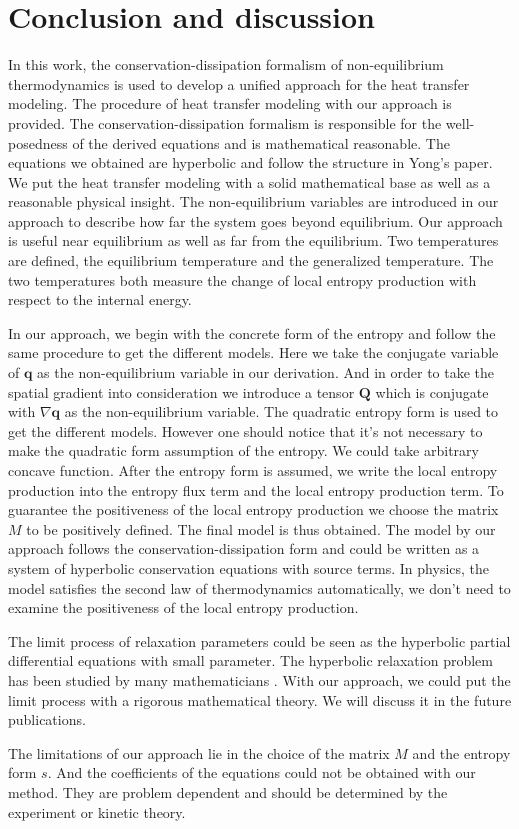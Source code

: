 \documentclass[a4paper]{article}
\begin{document}
\section{Conclusion and discussion}
In this work, the conservation-dissipation formalism of non-equilibrium thermodynamics is used to develop a unified approach for the heat transfer modeling. The procedure of heat transfer modeling with our approach is provided. The conservation-dissipation formalism is responsible for the well-posedness of the derived equations and is mathematical reasonable. The equations we obtained are hyperbolic and follow the structure in Yong's paper.\cite{yong2008interesting} We put the heat transfer modeling with a solid mathematical base as well as a reasonable physical insight. The non-equilibrium variables are introduced in our approach to describe how far the system goes beyond equilibrium. Our approach is useful near equilibrium as well as far from the equilibrium. Two temperatures are defined, the equilibrium temperature and the generalized temperature. The two temperatures both measure the change of local entropy production with respect to the internal energy. 

In our approach, we begin with the concrete form of the entropy and follow the same procedure to get the different models. Here we take the conjugate variable of $\mathbf{q}$ as the non-equilibrium variable in our derivation. And in order to take the spatial gradient into consideration we introduce a tensor $\mathbf{Q}$ which is conjugate with $\nabla \mathbf{q}$ as the non-equilibrium variable. The quadratic entropy form is used to get the different models. However one should notice that it's not necessary to make the quadratic form assumption of the entropy. We could take arbitrary concave function. After the entropy form is assumed, we write the local entropy production into the entropy flux term and the local entropy production term. To guarantee the positiveness of the local entropy production we choose the matrix $M$ to be positively defined. The final model is thus obtained. The model by our approach follows the conservation-dissipation form and could be written as a system of hyperbolic conservation equations with source terms. In physics, the model satisfies the second law of thermodynamics automatically, we don't need to examine the positiveness of the local entropy production.

The limit process of relaxation parameters could be seen as the hyperbolic partial differential equations with small parameter. The hyperbolic relaxation problem has been studied by many mathematicians \cite{yong2001basic,chen1994hyperbolic}. With our approach, we could put the limit process with a rigorous mathematical theory. We will discuss it in the future publications.

The limitations of our approach lie in the choice of the matrix $M$ and the entropy form $s$. And the coefficients of the equations could not be obtained with our method. They are problem dependent and should be determined by the experiment or kinetic theory.


{}

\end{document}
